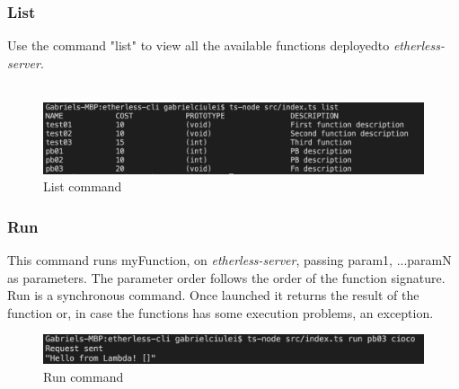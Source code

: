 \subsubsection{List}
Use the command "list" to view all the available functions deployed\glo to \textit{etherless-server}.\\\\
\centerline {}
\begin{figure}[h]
	\centering
	\includegraphics[width=\textwidth]{res/img/Screenshot_list.jpg}
	\caption{List command}
\end{figure}
\subsubsection{Run}
This command runs myFunction, on \textit{etherless-server}, passing param1, ...paramN as parameters. The parameter order follows the order of the function signature. Run is a synchronous command. Once launched it returns the result of the function or, in case the functions has some execution problems, an exception.\\
\centerline{}
\begin{figure}
	\centering
	\includegraphics[width=\textwidth]{res/img/Screenshot_run.png}
	\caption{Run command}
\end{figure}

